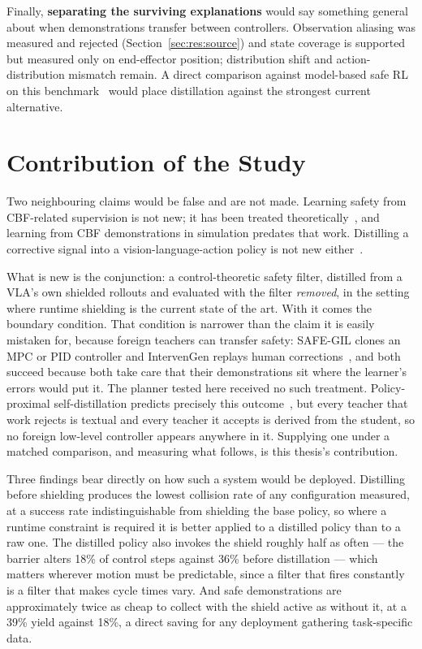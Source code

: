 Finally, \textbf{separating the surviving explanations} would say something general about when
demonstrations transfer between controllers. Observation aliasing was measured and rejected
(Section~\ref{sec:res:source}) and state coverage is supported but measured only on
end-effector position; distribution shift and action-distribution mismatch remain. A direct
comparison against model-based safe RL on this benchmark~\cite{safedojo} would place distillation
against the strongest current alternative.

\section{Contribution of the Study}\label{sec:conc:contribution}

Two neighbouring claims would be false and are not made. Learning safety from CBF-related
supervision is not new; it has been treated theoretically~\cite{cosner2022il_cbf}, and learning
from CBF demonstrations in simulation predates that work. Distilling a corrective signal into a
vision-language-action policy is not new either~\cite{wang2026roadvla}.

What is new is the conjunction: a control-theoretic safety filter, distilled from a VLA's own
shielded rollouts and evaluated with the filter \emph{removed}, in the setting where runtime
shielding is the current state of the art. With it comes the boundary condition. That condition is
narrower than the claim it is easily mistaken for, because foreign teachers can transfer safety:
SAFE-GIL clones an MPC or PID controller and IntervenGen replays human
corrections~\cite{ciftci2025safegil,hoque2024intervengen}, and both succeed because both take care
that their demonstrations sit where the learner's errors would put it. The planner tested here
received no such treatment. Policy-proximal self-distillation predicts precisely this
outcome~\cite{wang2026roadvla}, but every teacher that work rejects is textual and every teacher it
accepts is derived from the student, so no foreign low-level controller appears anywhere in it.
Supplying one under a matched comparison, and measuring what follows, is this thesis's
contribution.

Three findings bear directly on how such a system would be deployed. Distilling before shielding
produces the lowest collision rate of any configuration measured, at a success rate
indistinguishable from shielding the base policy, so where a runtime constraint is required it is
better applied to a distilled policy than to a raw one. The distilled policy also invokes the shield
roughly half as often --- the barrier alters 18\% of control steps against 36\% before distillation
--- which matters wherever motion must be predictable, since a filter that fires constantly is a
filter that makes cycle times vary. And safe demonstrations are approximately twice as cheap to
collect with the shield active as without it, at a 39\% yield against 18\%, a direct saving for any
deployment gathering task-specific data.

